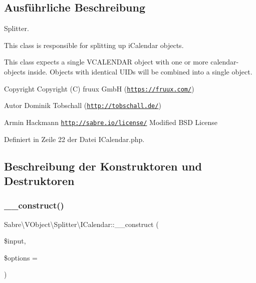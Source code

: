\subsection{Ausführliche Beschreibung}
Splitter.

This class is responsible for splitting up i\+Calendar objects.

This class expects a single V\+C\+A\+L\+E\+N\+D\+AR object with one or more calendar-\/objects inside. Objects with identical U\+ID\textquotesingle{}s will be combined into a single object.

\begin{DoxyCopyright}{Copyright}
Copyright (C) fruux GmbH (\href{https://fruux.com/}{\tt https\+://fruux.\+com/}) 
\end{DoxyCopyright}
\begin{DoxyAuthor}{Autor}
Dominik Tobschall (\href{http://tobschall.de/}{\tt http\+://tobschall.\+de/}) 

Armin Hackmann  \href{http://sabre.io/license/}{\tt http\+://sabre.\+io/license/} Modified B\+SD License 
\end{DoxyAuthor}


Definiert in Zeile 22 der Datei I\+Calendar.\+php.



\subsection{Beschreibung der Konstruktoren und Destruktoren}
\mbox{\label{class_sabre_1_1_v_object_1_1_splitter_1_1_i_calendar_ae57dda55b32775772e856b140468df06}} 
\subsubsection{\texorpdfstring{\+\_\+\+\_\+construct()}{\_\_construct()}}
{\footnotesize\ttfamily Sabre\textbackslash{}\+V\+Object\textbackslash{}\+Splitter\textbackslash{}\+I\+Calendar\+::\+\_\+\+\_\+construct (\begin{DoxyParamCaption}\item[{}]{\$input,  }\item[{}]{\$options = {} }\end{DoxyParamCaption})}


